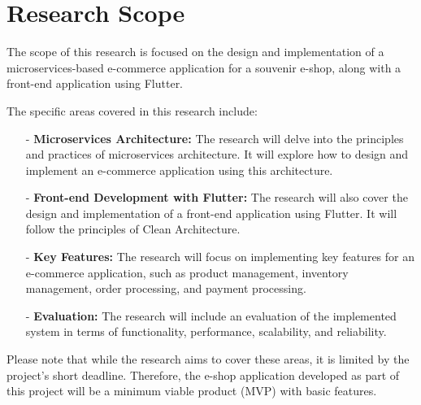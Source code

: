 \section{Research Scope}
The scope of this research is focused on the design and implementation of a microservices-based e-commerce application for a souvenir e-shop, along with a front-end application using Flutter.

The specific areas covered in this research include:
\begin{itemize}
    \item[-] \textbf{Microservices Architecture:} The research will delve into the principles and practices of microservices architecture. It will explore how to design and implement an e-commerce application using this architecture.
    \item[-] \textbf{Front-end Development with Flutter:} The research will also cover the design and implementation of a front-end application using Flutter. It will follow the principles of Clean Architecture.
    \item[-] \textbf{Key Features:} The research will focus on implementing key features for an e-commerce application, such as product management, inventory management, order processing, and payment processing.
    \item[-] \textbf{Evaluation:} The research will include an evaluation of the implemented system in terms of functionality, performance, scalability, and reliability.
\end{itemize}

Please note that while the research aims to cover these areas, it is limited by the project’s short deadline. Therefore, the e-shop application developed as part of this project will be a minimum viable product (MVP) with basic features.
